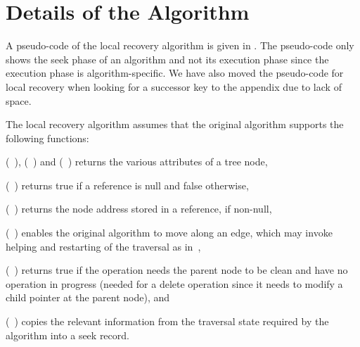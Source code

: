 \section{Details of the Algorithm}
\label{sec:description}



A pseudo-code of the local recovery algorithm is given in . The pseudo-code only shows the seek phase of an algorithm and not its execution phase since the execution phase is algorithm-specific. We have also moved the pseudo-code for local recovery when looking for a successor key to the appendix due to lack of space.


The local recovery algorithm assumes that the original algorithm supports the following functions:
\begin{enumerate*}[label=(\alph*)]
\item \GetKey(~), \IsMarked(~) and \GetChild(~) returns the various attributes of a tree node,
\item \IsNull(~) returns true if a reference is null and false otherwise,
\item \GetAddress(~) returns the node address stored in a reference, if non-null,
\item \Move(~) enables the original algorithm to move along an edge, which may invoke helping and restarting of the traversal as in~\cite{HowJon:2012:SPAA},
\item \NeedCleanParentNode(~) returns true if the operation needs the parent node to be clean and have no operation in progress (needed for a delete operation since it needs to modify a child pointer at the parent node), and
\item \PopulateSeekRecord(~) copies the relevant information from the traversal state required by the algorithm into a seek record.
\end{enumerate*}

\begin{comment}
\NeedSuccessorKey(~) evaluates if the successor key is still needed for the target key and returns a reference which is null if no successor key is needed and an address of the terminal node's right child otherwise
\end{comment}

